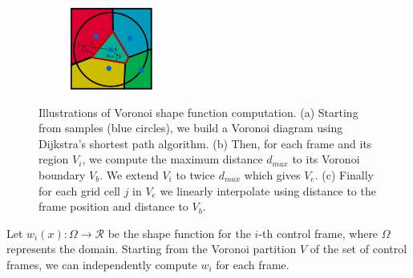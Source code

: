 \begin{figure}[!ht]
\begin{subfigure}[b]{0.20\linewidth}
\caption{\label{fig:buildSF2}}
\end{subfigure}
\hspace{2cm}
\begin{subfigure}[b]{0.20\linewidth}
\centering
\includegraphics[width=\linewidth]{images/cutting-mig2015/buildSF_3.pdf}
\caption{\label{fig:buildSF3}}
\end{subfigure}
\caption[Frame-based cutting: Voronoi shapefunction computation]{\label{fig:shapefunctionconstruction}
Illustrations of Voronoi shape function computation. (a) Starting from samples (blue circles), we build a Voronoi diagram using Dijkstra's shortest path algorithm. (b) Then, for each frame and its region $V_{i}$, we compute the maximum distance $d_{max}$ to its Voronoi boundary $V_{b}$. We extend $V_{i}$ to twice $d_{max}$ which gives $V_{e}$. (c) Finally for each grid cell $j$ in $V_{e}$ we linearly interpolate using distance to the frame position and distance to $V_{b}$.}
\end{figure}

Let $w_{i}(x) : \Omega \rightarrow \mathcal{R}$ be the shape function for the $i$-th control frame, where $\Omega$ represents the domain. Starting from the Voronoi partition $V$ of the set of control frames, we can independently compute $w_{i}$ for each frame.

